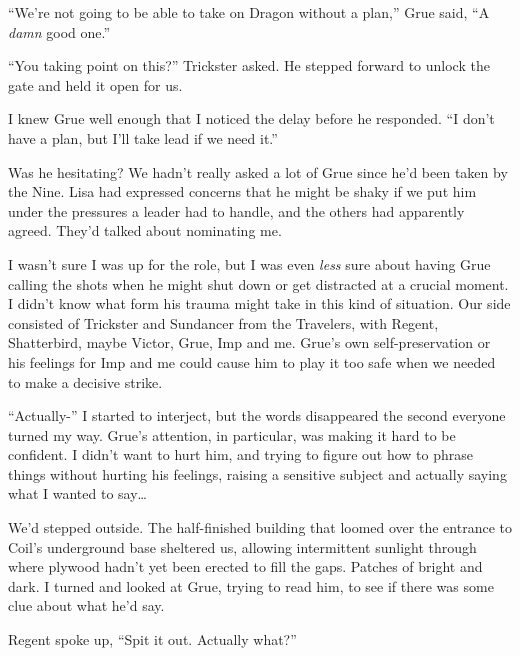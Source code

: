 





``We're not going to be able to take on Dragon without a plan,'' Grue said, ``A \emph{damn} good one.''



``You taking point on this?'' Trickster asked.  He stepped forward to unlock the gate and held it open for us.



I knew Grue well enough that I noticed the delay before he responded. ``I don't have a plan, but I'll take lead if we need it.''



Was he hesitating?  We hadn't really asked a lot of Grue since he'd been taken by the Nine.  Lisa had expressed concerns that he might be shaky if we put him under the pressures a leader had to handle, and the others had apparently agreed.  They'd talked about nominating me.



I wasn't sure I was up for the role, but I was\emph{ }even \emph{less} sure about having Grue calling the shots when he might shut down or get distracted at a crucial moment.  I didn't know what form his trauma might take in this kind of situation.  Our side consisted of Trickster and Sundancer from the Travelers, with Regent, Shatterbird, maybe Victor, Grue, Imp and me. Grue's own self-preservation or his feelings for Imp and me could cause him to play it too safe when we needed to make a decisive strike.



``Actually-'' I started to interject, but the words disappeared the second everyone turned my way.  Grue's attention, in particular, was making it hard to be confident.  I didn't want to hurt him, and trying to figure out how to phrase things without hurting his feelings, raising a sensitive subject and actually saying what I wanted to say\ldots



We'd stepped outside.  The half-finished building that loomed over the entrance to Coil's underground base sheltered us, allowing intermittent sunlight through where plywood hadn't yet been erected to fill the gaps.  Patches of bright and dark.  I turned and looked at Grue, trying to read him, to see if there was some clue about what he'd say.



Regent spoke up, ``Spit it out.  Actually what?''



